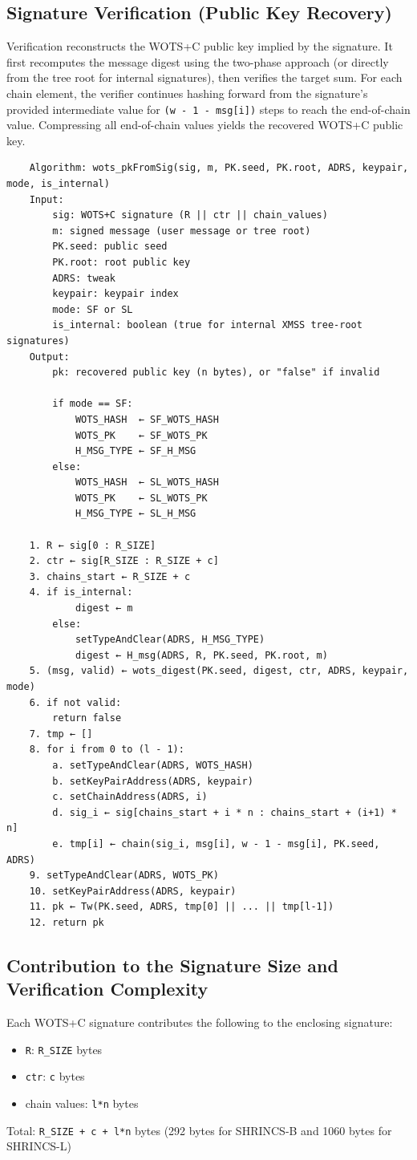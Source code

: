 \subsection{Signature Verification (Public Key Recovery)}
Verification reconstructs the WOTS+C public key implied by the signature. It first recomputes the message digest using the two-phase approach (or directly from the tree root for internal signatures), then verifies the target sum. For each chain element, the verifier continues hashing forward from the signature's provided intermediate value for \texttt{(w - 1 - msg[i])} steps to reach the end-of-chain value. Compressing all end-of-chain values yields the recovered WOTS+C public key.
\begin{verbatim}
    Algorithm: wots_pkFromSig(sig, m, PK.seed, PK.root, ADRS, keypair, mode, is_internal)
    Input:
        sig: WOTS+C signature (R || ctr || chain_values)
        m: signed message (user message or tree root)
        PK.seed: public seed
        PK.root: root public key
        ADRS: tweak
        keypair: keypair index
        mode: SF or SL
        is_internal: boolean (true for internal XMSS tree-root signatures)
    Output:
        pk: recovered public key (n bytes), or "false" if invalid

        if mode == SF:
            WOTS_HASH  ← SF_WOTS_HASH
            WOTS_PK    ← SF_WOTS_PK
            H_MSG_TYPE ← SF_H_MSG
        else:
            WOTS_HASH  ← SL_WOTS_HASH
            WOTS_PK    ← SL_WOTS_PK
            H_MSG_TYPE ← SL_H_MSG

    1. R ← sig[0 : R_SIZE]
    2. ctr ← sig[R_SIZE : R_SIZE + c]
    3. chains_start ← R_SIZE + c
    4. if is_internal:
            digest ← m
        else:
            setTypeAndClear(ADRS, H_MSG_TYPE)
            digest ← H_msg(ADRS, R, PK.seed, PK.root, m)
    5. (msg, valid) ← wots_digest(PK.seed, digest, ctr, ADRS, keypair, mode)
    6. if not valid:
        return false
    7. tmp ← []
    8. for i from 0 to (l - 1):
        a. setTypeAndClear(ADRS, WOTS_HASH)
        b. setKeyPairAddress(ADRS, keypair)
        c. setChainAddress(ADRS, i)
        d. sig_i ← sig[chains_start + i * n : chains_start + (i+1) * n]
        e. tmp[i] ← chain(sig_i, msg[i], w - 1 - msg[i], PK.seed, ADRS)
    9. setTypeAndClear(ADRS, WOTS_PK)
    10. setKeyPairAddress(ADRS, keypair)
    11. pk ← Tw(PK.seed, ADRS, tmp[0] || ... || tmp[l-1])
    12. return pk
\end{verbatim}

\subsection{Contribution to the Signature Size and Verification Complexity}
Each WOTS+C signature contributes the following to the enclosing signature:
\begin{itemize}
    \item \texttt{R}: \texttt{R\_SIZE} bytes
    \item \texttt{ctr}: \texttt{c} bytes
    \item chain values: \texttt{l*n} bytes
\end{itemize}
Total: \texttt{R\_SIZE + c + l*n} bytes (292 bytes for SHRINCS-B and 1060 bytes for SHRINCS-L)


